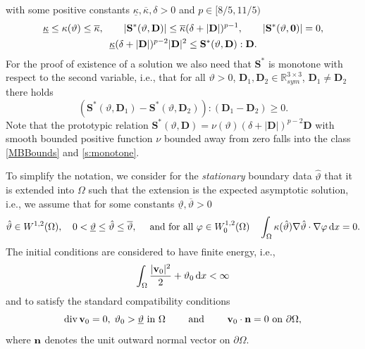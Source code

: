 \documentclass[11pt, a4paper, reqno]{amsart}
\newcommand{\R}{{\mathbb R}}
\numberwithin{equation}{section}
\newcommand{\diver}{\operatorname{div}}
\newcommand{\thetah}{\hat\thet}
\newcommand{\vc}[1]{{\bf #1}}
\newcommand{\vv}{\vc{v}}
\newcommand{\thet}{\vartheta}
\renewcommand{\S}{\mathbf{S}}
\newcommand{\D}{\mathbf{D}}
\newcommand{\dx}{\,{\rm d} {x}}
\newcommand{\intO}[1]{\int_{\Omega} #1 \dx}
\newcommand{\tmin}{\underline{\thet}}
\newcommand{\tmax}{\overline{\thet}}
\begin{document}
with some positive constants $\underline{\kappa}, \overline{\kappa}, \delta >0$ %
and $p\in [8/5, 11/5)$
\begin{equation}
\label{MBBounds}
\begin{gathered}
\underline{\kappa}\le \kappa(\thet)\le \overline{\kappa}, \qquad |\S^*(\thet,\D)|\le \overline{\kappa}(\delta + |\D|)^{p-1}, \qquad |\S^*(\thet, \vc{0})|=0,\\
\underline{\kappa}(\delta + |\D|)^{p-2}|\D|^2 \le \S^*(\thet,\D):\D.
\end{gathered}
\end{equation}
For the proof of existence of a solution we also need that $\S^*$ is monotone with respect to the second variable, i.e., that  for all $\thet>0$, $\D_1,\D_2\in\R^{3\times 3}_{sym}$, $\D_1\neq\D_2$ there holds
\begin{equation}\label{s:monotone}
(\S^*(\thet,\D_1)-\S^*(\thet,\D_2)):(\D_1-\D_2)\ge 0.
\end{equation}
Note that the prototypic relation $\S^*(\thet,\D)=\nu(\thet)(\delta + |\D|)^{p-2}\D$ with smooth bounded positive function $\nu$ bounded away from zero falls into the class \eqref{MBBounds} and \eqref{s:monotone}.

To simplify the notation, we consider for the \emph{stationary} boundary data $\thetah$ that it is extended into $\Omega$ such that the extension is the expected asymptotic solution, i.e., we assume that for some constants $\tmin,\tmax>0$
\begin{equation}\label{MB6}
\thetah\in W^{1,2}(\Omega),\quad 0<\tmin\le \thetah \le \tmax, \quad \mbox{ and for all } \varphi\in W^{1,2}_0(\Omega)  \quad \intO{\kappa(\thetah)\nabla \thetah\cdot \nabla \varphi}=0.
\end{equation}
The initial conditions are considered to have finite energy, i.e.,
\begin{equation}\label{MB7}
\intO{\frac{|\vv_0|^2}{2} + \thet_0} <\infty
\end{equation}
and to satisfy the standard compatibility conditions
\begin{equation}\label{MB7.5}
\diver \vv_0 =0, \; \thet_0 >\tmin \textrm{ in } \Omega \qquad \textrm{ and } \qquad \vv_0  \cdot \vc{n} = 0 \textrm{ on } \partial\Omega,
\end{equation}
where $\vc{n}$ denotes the unit outward normal vector on $\partial \Omega$.
\end{document}
